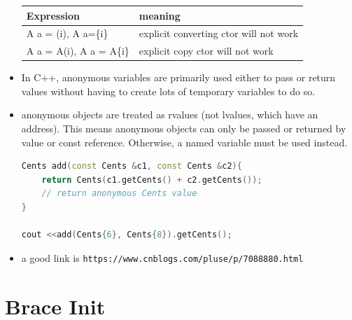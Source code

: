 \documentclass[a4paper,12pt,twoside]{book}
\begin{document}
\begin{itemize}
	\begin{tabular}{|p{}|p{}|}
	\hline
	Expression & meaning \\
	\hline
	A a = (i), A a=\{i\} & explicit converting ctor will not work \\
	\hline
	A a = A(i), A a = A\{i\} & explicit copy ctor will not work \\
	\hline
\end{tabular}

\item In C++, anonymous variables are primarily used either to pass or return values without having to create lots of temporary variables to do so.
		
\item anonymous objects are treated as rvalues (not lvalues, which have an address). This means anonymous objects can only be passed or returned by value or const reference. Otherwise, a named variable must be used instead.
		
\begin{lstlisting}[frame=single, language=c++]
Cents add(const Cents &c1, const Cents &c2){
	return Cents(c1.getCents() + c2.getCents());
	// return anonymous Cents value
}
		
cout <<add(Cents{6}, Cents{8}).getCents();
\end{lstlisting}

\item a good link is \verb|https://www.cnblogs.com/pluse/p/7088880.html|
	
\end{itemize}



\section{Brace Init}
\end{document}
